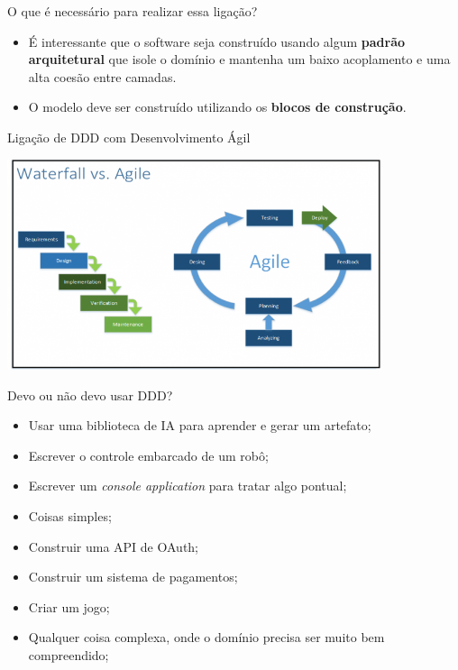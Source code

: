 \documentclass[aspectratio=169]{beamer}
\begin{document}
\begin{frame}{O que é necessário para realizar essa ligação?}	
	\begin{itemize}	
		\item É interessante que o software seja construído usando algum \textbf{padrão arquitetural} que isole o domínio e mantenha um baixo acoplamento e uma alta coesão entre camadas. 
		\item O modelo deve ser construído utilizando os \textbf{blocos de construção}.
	\end{itemize}
\end{frame}

\begin{frame}{Ligação de DDD com Desenvolvimento Ágil}	
	\begin{center}
		\includegraphics[width=11cm]{imgs/agile-waterfall}
	\end{center}
\end{frame}

\begin{frame}{Devo ou não devo usar DDD?}	
	\begin{multicols}{2}		
		\begin{itemize}	
			\item Usar uma biblioteca de IA para aprender e gerar um artefato;
			\item Escrever o controle embarcado de um robô;
			\item Escrever um \textit{console application} para tratar algo pontual;
			\item Coisas simples; 
		\end{itemize}
		\begin{itemize}	
			\item Construir uma API de OAuth;
			\item Construir um sistema de pagamentos;
			\item Criar um jogo;
			\item Qualquer coisa complexa, onde o domínio precisa ser muito bem compreendido;
		\end{itemize}
	\end{multicols}
\end{frame}
\end{document}
